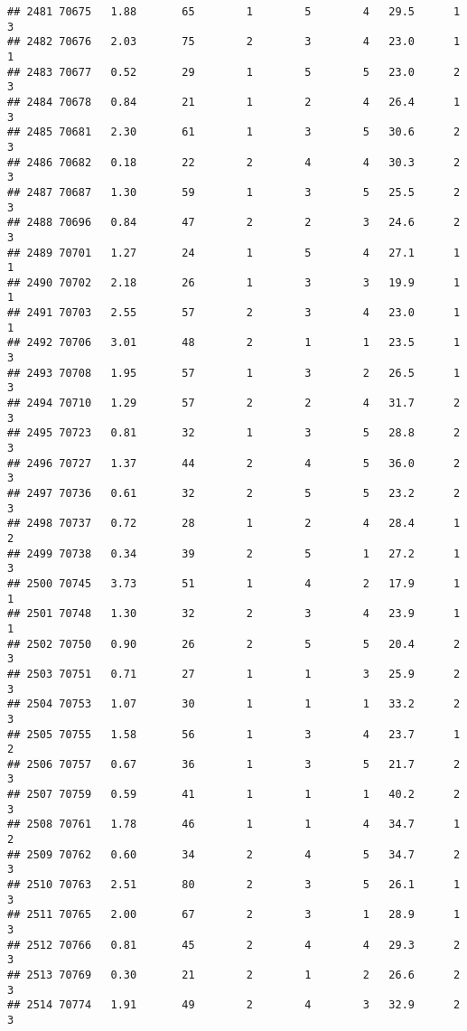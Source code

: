 \documentclass[
]{article}
\begin{document}
\begin{verbatim}
## 2481 70675   1.88       65        1        5        4   29.5      1      3
## 2482 70676   2.03       75        2        3        4   23.0      1      1
## 2483 70677   0.52       29        1        5        5   23.0      2      3
## 2484 70678   0.84       21        1        2        4   26.4      1      3
## 2485 70681   2.30       61        1        3        5   30.6      2      3
## 2486 70682   0.18       22        2        4        4   30.3      2      3
## 2487 70687   1.30       59        1        3        5   25.5      2      3
## 2488 70696   0.84       47        2        2        3   24.6      2      3
## 2489 70701   1.27       24        1        5        4   27.1      1      1
## 2490 70702   2.18       26        1        3        3   19.9      1      1
## 2491 70703   2.55       57        2        3        4   23.0      1      1
## 2492 70706   3.01       48        2        1        1   23.5      1      3
## 2493 70708   1.95       57        1        3        2   26.5      1      3
## 2494 70710   1.29       57        2        2        4   31.7      2      3
## 2495 70723   0.81       32        1        3        5   28.8      2      3
## 2496 70727   1.37       44        2        4        5   36.0      2      3
## 2497 70736   0.61       32        2        5        5   23.2      2      3
## 2498 70737   0.72       28        1        2        4   28.4      1      2
## 2499 70738   0.34       39        2        5        1   27.2      1      3
## 2500 70745   3.73       51        1        4        2   17.9      1      1
## 2501 70748   1.30       32        2        3        4   23.9      1      1
## 2502 70750   0.90       26        2        5        5   20.4      2      3
## 2503 70751   0.71       27        1        1        3   25.9      2      3
## 2504 70753   1.07       30        1        1        1   33.2      2      3
## 2505 70755   1.58       56        1        3        4   23.7      1      2
## 2506 70757   0.67       36        1        3        5   21.7      2      3
## 2507 70759   0.59       41        1        1        1   40.2      2      3
## 2508 70761   1.78       46        1        1        4   34.7      1      2
## 2509 70762   0.60       34        2        4        5   34.7      2      3
## 2510 70763   2.51       80        2        3        5   26.1      1      3
## 2511 70765   2.00       67        2        3        1   28.9      1      3
## 2512 70766   0.81       45        2        4        4   29.3      2      3
## 2513 70769   0.30       21        2        1        2   26.6      2      3
## 2514 70774   1.91       49        2        4        3   32.9      2      3

\end{verbatim}
\end{document}

